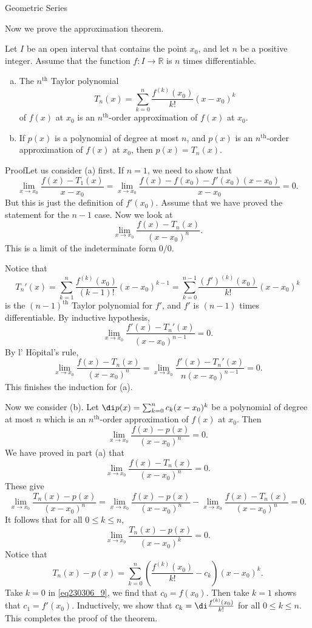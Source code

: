 \begin{example}[label=230305_16]{Geometric Series}
\begin{example}[label=230304_9]{}
\begin{example}{}
Now we prove the approximation theorem.
\begin{theorem}[label=230307_2]{}Let $I$ be an open interval that contains the point $x_0$, and let $n$ be a positive integer. Assume that the function $f:I\to\mathbb{R}$   is $n$ times differentiable.
\begin{enumerate}[(a)]
\item The $n^{\text{th}}$ Taylor polynomial \[T_n(x)=\sum_{k=0}^n\frac{f^{(k)}(x_0)}{k!}(x-x_0)^k\] of $f(x)$ at $x_0$ is an $n^{\text{th}}$-order approximation of $f(x)$ at $x_0$.
\item If $p(x)$ is a polynomial of degree at most $n$, and $p(x)$  is an $n^{\text{th}}$-order approximation of $f(x)$ at $x_0$, then $p(x)=T_n(x)$.

\end{enumerate}
\end{theorem}
\begin{myproof}{Proof}Let us  consider (a) first.
If $n=1$, we need to show that
\[\lim_{x\to x_0}\frac{f(x)-T_1(x)}{x-x_0}=\lim_{x\to x_0}\frac{f(x)-f(x_0)-f'(x_0)(x-x_0)}{x-x_0}=0.\] 
But this is just the definition of $f'(x_0)$.
  Assume that we have proved the statement for the $n-1$ case. Now we look at
\[\lim_{x\to x_0}\frac{f(x)-T_n(x)}{(x-x_0)^n}.\]This is a limit of the indeterminate form $0/0$. 

Notice that \[T_n'(x)=\sum_{k=1}^n\frac{f^{(k)}(x_0)}{(k-1)!}(x-x_0)^{k-1}=\sum_{k=0}^{n-1}\frac{(f')^{(k)}(x_0)}{k!}(x-x_0)^k\] 
is the $(n-1)^{\text{th}}$ Taylor polynomial for $f'$, and $f'$ is $(n-1)$ times differentiable. By inductive hypothesis,
\[\lim_{x\to x_0}\frac{f'(x)-T_n'(x)}{(x-x_0)^{n-1}}=0.\]
By   l' H$\hat{\text{o}}$pital's rule,
\[\lim_{x\to x_0}\frac{f(x)-T_n(x)}{(x-x_0)^n}=\lim_{ x\to x_0}\frac{f'( x)-T_n'(x)}{n(x-x_0)^{n-1}}=0.\]This finishes the induction for (a).
 
Now we consider (b). 
Let $\di p(x)=\sum_{k=0}^nc_k(x-x_0)^k$ be a polynomial of degree at most $n$ which  is an $n^{\text{th}}$-order approximation of $f(x)$ at $x_0$. Then
\[\lim_{x\to x_0}\frac{f(x)-p(x)}{(x-x_0)^n}=0.\]
We have proved in part (a) that
\[\lim_{x\to x_0}\frac{f(x)-T_n(x)}{(x-x_0)^n}=0.\] \bp
These give
\[\lim_{x\to x_0}\frac{T_n(x)-p(x)}{(x-x_0)^n}=\lim_{x\to x_0}\frac{f(x)-p(x)}{(x-x_0)^n}-\lim_{x\to x_0}\frac{f(x)-T_n(x)}{(x-x_0)^n}=0.\]
It follows that for all $0\leq k\leq n$, 
\begin{equation}\label{eq230306_9}\lim_{x\to x_0}\frac{T_n(x)-p(x)}{(x-x_0)^k}=0.\end{equation}
Notice that
\[T_n(x)-p(x)=\sum_{k=0}^n \left(\frac{f^{(k)}(x_0)}{k!}-c_k\right)(x-x_0)^k.\]
Take $k=0$ in \eqref{eq230306_9}, we find that
$c_0=f(x_0)$. Then take $k=1$ shows that $c_1=f'(x_0)$. Inductively, we show that $c_k=\di\frac{f^{(k)}(x_0)}{k!}$ for all $0\leq k\leq n$. This completes the proof of the theorem.
\end{myproof}


\end{example}
\end{example}
\end{example}
